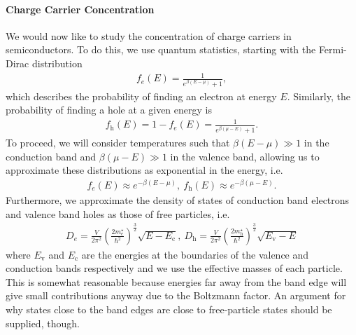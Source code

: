 \paragraph{Charge Carrier Concentration}
We would now like to study the concentration of charge carriers in semiconductors. To do this, we use quantum statistics, starting with the Fermi-Dirac distribution
\begin{align*}
	f_{e}(E) = \frac{1}{e^{\beta(E - \mu)} + 1},
\end{align*}
which describes the probability of finding an electron at energy $E$. Similarly, the probability of finding a hole at a given energy is
\begin{align*}
	f_{\text{h}}(E) = 1 - f_{e}(E) = \frac{1}{e^{\beta(\mu - E)} + 1}.
\end{align*}
To proceed, we will consider temperatures such that $\beta(E - \mu) \gg 1$ in the conduction band and $\beta(\mu - E) \gg 1$ in the valence band, allowing us to approximate these distributions as exponential in the energy, i.e.
\begin{align*}
	f_{e}(E) \approx e^{-\beta(E - \mu)},\ f_{\text{h}}(E) \approx e^{-\beta(\mu - E)}.
\end{align*}
Furthermore, we approximate the density of states of conduction band electrons and valence band holes as those of free particles, i.e.
\begin{align*}
	D_{e} = \frac{V}{2\pi^{2}}\left(\frac{2m^{\star}_{e}}{\hbar^{2}}\right)^{\frac{3}{2}}\sqrt{E - E_{\text{c}}},\ D_{\text{h}} = \frac{V}{2\pi^{2}}\left(\frac{2m^{\star}_{\text{h}}}{\hbar^{2}}\right)^{\frac{3}{2}}\sqrt{E_{\text{v}} - E}
\end{align*}
where $E_{\text{v}}$ and $E_{\text{c}}$ are the energies at the boundaries of the valence and conduction bands respectively and we use the effective masses of each particle. This is somewhat reasonable because energies far away from the band edge will give small contributions anyway due to the Boltzmann factor. An argument for why states close to the band edges are close to free-particle states should be supplied, though.

